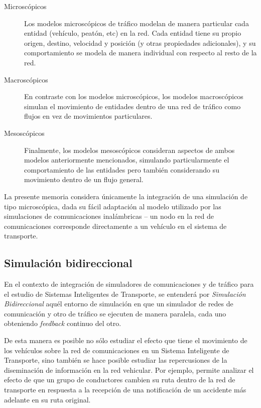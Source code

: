 \begin{description}
    \item[Microscópicos] Los modelos microscópicos de tráfico modelan de manera particular cada entidad (vehículo, peatón, etc) en la red. Cada entidad tiene su propio origen, destino, velocidad y posición (y otras propiedades adicionales), y su comportamiento se modela de manera individual con respecto al resto de la red. 
    \item[Macroscópicos] En contraste con los modelos microscópicos, los modelos macroscópicos simulan el movimiento de entidades dentro de una red de tráfico como flujos en vez de movimientos particulares.
    \item[Mesoscópicos] Finalmente, los modelos mesoscópicos consideran aspectos de ambos modelos anteriormente mencionados, simulando particularmente el comportamiento de las entidades pero también considerando su movimiento dentro de un flujo general.
\end{description}

La presente memoria considera únicamente la integración de una simulación de tipo microscópica, dada su fácil adaptación al modelo utilizado por las simulaciones de comunicaciones inalámbricas -- un nodo en la red de comunicaciones corresponde directamente a un vehículo en el sistema de transporte.

\subsection{Simulación bidireccional}

En el contexto de integración de simuladores de comunicaciones y de tráfico para el estudio de Sistemas Inteligentes de Transporte, se entenderá por \emph{Simulación Bidireccional} aquél entorno de simulación en que un simulador de redes de comunicación y otro de tráfico se ejecuten de manera paralela, cada uno obteniendo \emph{feedback} continuo del otro.

De esta manera es posible no sólo estudiar el efecto que tiene el movimiento de los vehículos sobre la red de comunicaciones en un Sistema Inteligente de Transporte, sino también se hace posible estudiar las repercusiones de la diseminación de información en la red vehicular. Por ejemplo, permite analizar el efecto de que un grupo de conductores cambien su ruta dentro de la red de transporte en respuesta a la recepción de una notificación de un accidente más adelante en su ruta original.